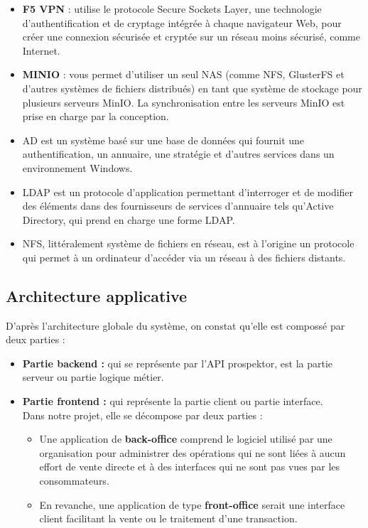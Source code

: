 \begin{itemize}
\item \textbf{F5 VPN} : utilise le protocole Secure Sockets Layer, une technologie d'authentification et de cryptage int\'egr\'ee \`a chaque navigateur Web, pour cr\'eer une connexion s\'ecuris\'ee et crypt\'ee sur un r\'eseau moins s\'ecuris\'e, comme Internet.
\item \textbf{MINIO} : vous permet d'utiliser un seul \gls{NAS} (comme \gls{NFS}, GlusterFS et d'autres syst\`emes de fichiers distribu\'es) en tant que syst\`eme de stockage pour plusieurs serveurs MinIO. La synchronisation entre les serveurs MinIO est prise en charge par la conception.
\item \gls{AD} est un syst\`eme bas\'e sur une base de donn\'ees qui fournit une authentification, un annuaire, une strat\'egie et d'autres services dans un environnement Windows.
\item \gls{LDAP} est un protocole d'application permettant d'interroger et de modifier des \'el\'ements dans des fournisseurs de services d'annuaire tels qu'Active Directory, qui prend en charge une forme LDAP.
\item \gls{NFS}, litt\'eralement syst\`eme de fichiers en r\'eseau, est \`a l'origine un protocole qui permet \`a un ordinateur d'acc\'eder via un r\'eseau \`a des fichiers distants.
\end{itemize}

\subsection{Architecture applicative} 

D'apr\`es l'architecture globale du syst\`eme, on constat qu'elle est composs\'e par deux parties :

\begin{itemize}
\item \textbf{Partie backend :} qui se repr\'esente par l'API prospektor, est la partie serveur ou partie logique m\'etier.
\item \textbf{Partie frontend :} qui repr\'esente la partie client ou partie interface.\\
Dans notre projet, elle se d\'ecompose par deux parties :
\begin{itemize}
\item Une application de \textbf{back-office} comprend le logiciel utilis\'e par une organisation pour administrer des op\'erations qui ne sont li\'ees \`a aucun effort de vente directe et \`a des interfaces qui ne sont pas vues par les consommateurs.
\item En revanche, une application de type \textbf{front-office} serait une interface client facilitant la vente ou le traitement d'une transaction.
\end{itemize}
\end{itemize}



